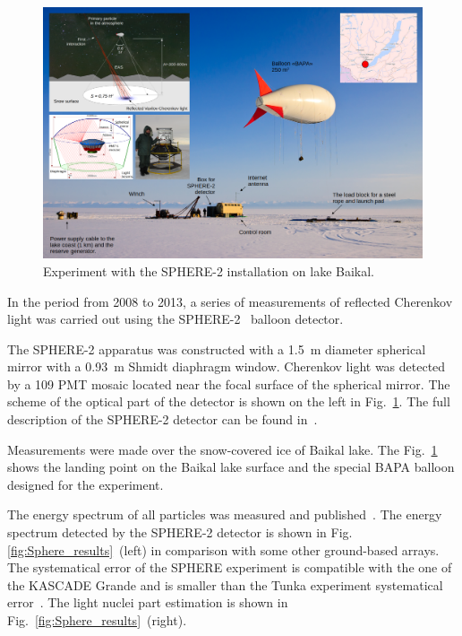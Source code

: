 \documentclass[a4paper,11pt]{article}
\begin{document}
\begin{figure}[t]
\centering
\includegraphics[width=1.0\textwidth]{Sphere2Baikal.png}
\caption{\label{fig:Sphere_Baikal} Experiment with the SPHERE-2 installation on lake Baikal.}
\end{figure}

In the period from 2008 to 2013, a series of measurements of reflected Cherenkov light was carried out using the SPHERE-2~\cite{Ant15a,Ant15c,Ant19} balloon detector. 

The SPHERE-2 apparatus was constructed with a 1.5~m diameter spherical mirror with a 0.93~m Shmidt diaphragm window. Cherenkov light was detected by a 109 PMT mosaic located near the focal surface of the spherical mirror. The scheme of the optical part of the detector is shown on the left in Fig.~\ref{fig:Sphere_Baikal}. The full description of the SPHERE-2 detector can be found in~\cite{Ant15a,Ant20}.

Measurements were made over the snow-covered ice of Baikal lake. The Fig.~\ref{fig:Sphere_Baikal} shows the landing point on the Baikal lake surface and the special BAPA balloon designed for the experiment. 

The energy spectrum of all particles was measured and published~\cite{Ant15c}. The energy spectrum detected by the SPHERE-2 detector is shown in Fig.\ref{fig:Sphere_results}~(left) in comparison with some other ground-based arrays. The systematical error of the SPHERE experiment is compatible with the one of the KASCADE Grande and is smaller than the Tunka experiment systematical error~\cite{Tunka2020}. The light nuclei part estimation is shown in Fig.~\ref{fig:Sphere_results}~(right). 
\end{document}
